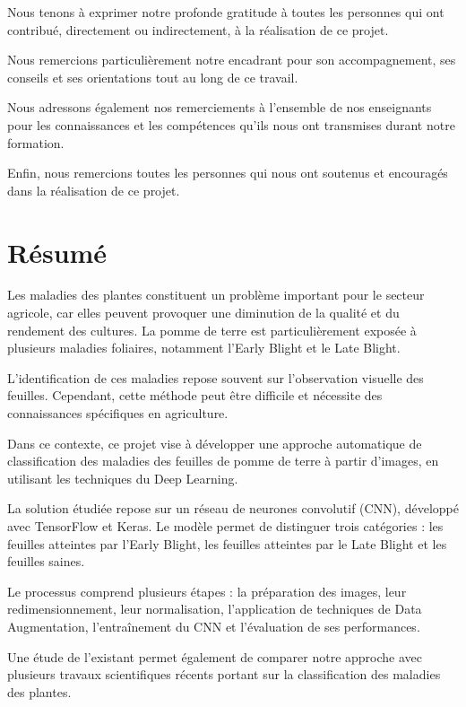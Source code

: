 \documentclass[12pt,a4paper,oneside]{report}
\begin{document}
Nous tenons à exprimer notre profonde gratitude à toutes
les personnes qui ont contribué, directement ou indirectement,
à la réalisation de ce projet.

Nous remercions particulièrement notre encadrant pour
son accompagnement, ses conseils et ses orientations
tout au long de ce travail.

Nous adressons également nos remerciements à l'ensemble
de nos enseignants pour les connaissances et les compétences
qu'ils nous ont transmises durant notre formation.

Enfin, nous remercions toutes les personnes qui nous ont
soutenus et encouragés dans la réalisation de ce projet.


\chapter*{Résumé}

Les maladies des plantes constituent un problème important
pour le secteur agricole, car elles peuvent provoquer une
diminution de la qualité et du rendement des cultures.
La pomme de terre est particulièrement exposée à plusieurs
maladies foliaires, notamment l'Early Blight et le Late Blight.

L'identification de ces maladies repose souvent sur
l'observation visuelle des feuilles. Cependant, cette méthode
peut être difficile et nécessite des connaissances spécifiques
en agriculture.

Dans ce contexte, ce projet vise à développer une approche
automatique de classification des maladies des feuilles
de pomme de terre à partir d'images, en utilisant les techniques
du Deep Learning.

La solution étudiée repose sur un réseau de neurones
convolutif (CNN), développé avec TensorFlow et Keras.
Le modèle permet de distinguer trois catégories :
les feuilles atteintes par l'Early Blight, les feuilles atteintes
par le Late Blight et les feuilles saines.

Le processus comprend plusieurs étapes : la préparation
des images, leur redimensionnement, leur normalisation,
l'application de techniques de Data Augmentation,
l'entraînement du CNN et l'évaluation de ses performances.

Une étude de l'existant permet également de comparer
notre approche avec plusieurs travaux scientifiques récents
portant sur la classification des maladies des plantes.
\end{document}
